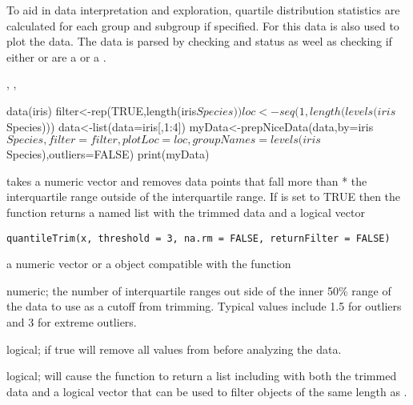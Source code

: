 \documentclass[a4paper]{book}
\begin{document}
%
\begin{Details}\relax
To aid in data interpretation and exploration, quartile distribution statistics are calculated for each group and subgroup
if specified. For  this data is also used to plot the data. The data is parsed by checking  and  status
as weel as checking if either  or  are a  or a .
\end{Details}
%
\begin{SeeAlso}\relax
{}, , 
\end{SeeAlso}
%
\begin{Examples}
\begin{ExampleCode}
data(iris)
filter<-rep(TRUE,length(iris$Species))
loc<-seq(1,length(levels(iris$Species)))
data<-list(data=iris[,1:4])
myData<-prepNiceData(data,by=iris$Species,filter=filter,plotLoc=loc,
    groupNames=levels(iris$Species),outliers=FALSE)
print(myData)

\end{ExampleCode}
\end{Examples}
%
\begin{Description}\relax
{} takes a numeric vector and removes data points that fall more than  * the interquartile range outside of the interquartile range. If  is set to TRUE then the function returns a named list with the trimmed data and a logical vector
\end{Description}
%
\begin{Usage}
\begin{verbatim}
quantileTrim(x, threshold = 3, na.rm = FALSE, returnFilter = FALSE)
\end{verbatim}
\end{Usage}
%
\begin{Arguments}
\begin{ldescription}
\item[\code{x}] a numeric vector or a object compatible with the  function

\item[\code{threshold}] numeric; the number of interquartile ranges out side of the inner 50\% range of the data to use as a cutoff from trimming. Typical values include 1.5 for outliers and 3 for extreme outliers.

\item[\code{na.rm}] logical; if true will remove all  values from  before analyzing the data.

\item[\code{returnFilter}] logical; will cause the function to return a list including with both the trimmed data and a logical vector that can be used to filter objects of the same length as .
\end{ldescription}
\end{Arguments}
\end{document}
